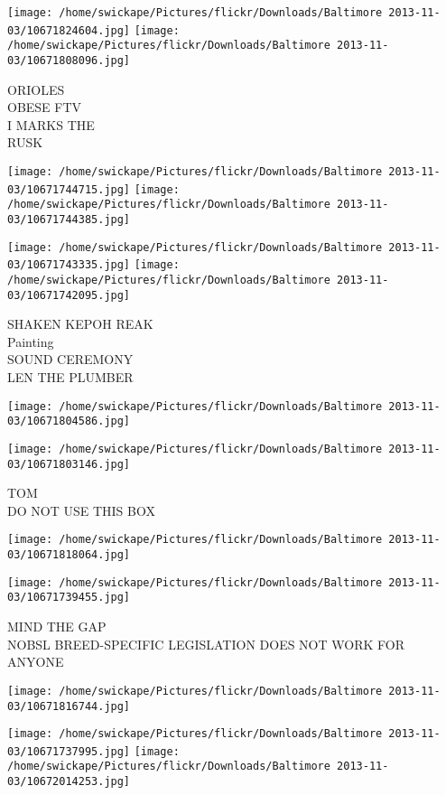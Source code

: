 \documentclass[10pt,letterpaper]{article}
\begin{document}
\texttt{[image: /home/swickape/Pictures/flickr/Downloads/Baltimore 2013-11-03/10671824604.jpg]}
\texttt{[image: /home/swickape/Pictures/flickr/Downloads/Baltimore 2013-11-03/10671808096.jpg]}

ORIOLES\\
OBESE FTV\\
I MARKS THE\\
RUSK\\
\pagebreak

\texttt{[image: /home/swickape/Pictures/flickr/Downloads/Baltimore 2013-11-03/10671744715.jpg]}
\texttt{[image: /home/swickape/Pictures/flickr/Downloads/Baltimore 2013-11-03/10671744385.jpg]}

\texttt{[image: /home/swickape/Pictures/flickr/Downloads/Baltimore 2013-11-03/10671743335.jpg]}
\texttt{[image: /home/swickape/Pictures/flickr/Downloads/Baltimore 2013-11-03/10671742095.jpg]}

SHAKEN KEPOH REAK\\
Painting\\
SOUND CEREMONY\\
LEN THE PLUMBER\\
\pagebreak

\texttt{[image: /home/swickape/Pictures/flickr/Downloads/Baltimore 2013-11-03/10671804586.jpg]}

\vspace{0.25in}
\texttt{[image: /home/swickape/Pictures/flickr/Downloads/Baltimore 2013-11-03/10671803146.jpg]}

TOM\\
DO NOT USE THIS BOX\\
\pagebreak

\texttt{[image: /home/swickape/Pictures/flickr/Downloads/Baltimore 2013-11-03/10671818064.jpg]}

\vspace{0.25in}
\texttt{[image: /home/swickape/Pictures/flickr/Downloads/Baltimore 2013-11-03/10671739455.jpg]}

MIND THE GAP\\
NOBSL BREED{-}SPECIFIC LEGISLATION DOES NOT WORK FOR ANYONE\\
\pagebreak

\texttt{[image: /home/swickape/Pictures/flickr/Downloads/Baltimore 2013-11-03/10671816744.jpg]}

\vspace{0.25in}
\texttt{[image: /home/swickape/Pictures/flickr/Downloads/Baltimore 2013-11-03/10671737995.jpg]}
\texttt{[image: /home/swickape/Pictures/flickr/Downloads/Baltimore 2013-11-03/10672014253.jpg]}
\end{document}
